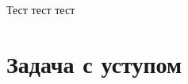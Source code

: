 \documentclass[12pt]{article}
\begin{document}
Тест тест тест







\newpage

\section{Задача с уступом}




\end{document}
